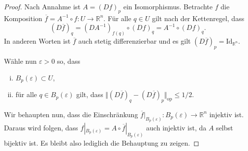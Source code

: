 \documentclass[../main.tex]{subfiles}
\begin{document}
\begin{proof}
  Nach Annahme ist $A = {(Df)}_p$ ein Isomorphismus.
  Betrachte $f$ die Komposition
  $\overline f = A^{-1} \circ f \colon U \to \mathbb{R}^n$.
  Für alle $q \in U$ 
  gilt nach der Kettenregel, dass
  \[
    {(D \overline f)}_q = {(DA^{-1})}_{f(q)} \circ {(Df)}_q
    = A^{-1} \circ {(Df)}_q.
  \]
  In anderen Worten ist $\overline f$ auch stetig differenzierbar
  und es gilt
  \(
    {(D \overline f)}_p = \text{Id}_{\mathbb{R}^n}.
  \)

  Wähle nun $\varepsilon > 0$ so, dass
  \begin{enumerate}[(i)]
    \item $B_p(\varepsilon) \subset U$,
    \item für alle $q \in B_p(\varepsilon)$ gilt, dass
      \(
        \Vert {(D \overline f)}_q - {(D \overline f)}_p \Vert_{\text{op}}
          \leq 1/2
      \).
  \end{enumerate}
  Wir behaupten nun, dass die Einschränkung
  $ \overline f |_{B_p(\varepsilon)} \colon B_p(\varepsilon) \to \mathbb{R}^n$ 
  injektiv ist.
  Daraus wird folgen, dass $f |_{B_p(\varepsilon)} = A \circ
  \overline f |_{B_p(\varepsilon)}$ auch injektiv ist, da $A$ selbst
  bijektiv ist.
  Es bleibt also lediglich die Behauptung zu zeigen.


\end{proof}
\end{document}
